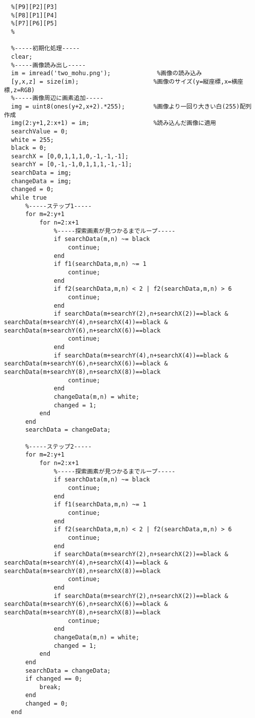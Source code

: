 \documentclass[a4j]{jarticle}
\begin{document}
\begin{verbatim}
  %[P9][P2][P3]
  %[P8][P1][P4]
  %[P7][P6][P5]
  %

  %-----初期化処理-----
  clear;
  %-----画像読み出し-----
  im = imread('two_mohu.png');             %画像の読み込み
  [y,x,z] = size(im);                     %画像のサイズ(y=縦座標,x=横座標,z=RGB)
  %-----画像周辺に画素追加-----
  img = uint8(ones(y+2,x+2).*255);        %画像より一回り大きい白(255)配列作成
  img(2:y+1,2:x+1) = im;                  %読み込んだ画像に適用
  searchValue = 0;
  white = 255;
  black = 0;
  searchX = [0,0,1,1,1,0,-1,-1,-1];
  searchY = [0,-1,-1,0,1,1,1,-1,-1];
  searchData = img;
  changeData = img;
  changed = 0;
  while true
      %-----ステップ1-----
      for m=2:y+1
          for n=2:x+1
              %-----探索画素が見つかるまでループ-----
              if searchData(m,n) ~= black
                  continue;
              end
              if f1(searchData,m,n) ~= 1
                  continue;
              end
              if f2(searchData,m,n) < 2 | f2(searchData,m,n) > 6
                  continue;
              end
              if searchData(m+searchY(2),n+searchX(2))==black & searchData(m+searchY(4),n+searchX(4))==black & searchData(m+searchY(6),n+searchX(6))==black
                  continue;
              end
              if searchData(m+searchY(4),n+searchX(4))==black & searchData(m+searchY(6),n+searchX(6))==black & searchData(m+searchY(8),n+searchX(8))==black
                  continue;
              end
              changeData(m,n) = white;
              changed = 1;
          end
      end
      searchData = changeData;

      %-----ステップ2-----
      for m=2:y+1
          for n=2:x+1
              %-----探索画素が見つかるまでループ-----
              if searchData(m,n) ~= black
                  continue;
              end
              if f1(searchData,m,n) ~= 1
                  continue;
              end
              if f2(searchData,m,n) < 2 | f2(searchData,m,n) > 6
                  continue;
              end
              if searchData(m+searchY(2),n+searchX(2))==black & searchData(m+searchY(4),n+searchX(4))==black & searchData(m+searchY(8),n+searchX(8))==black
                  continue;
              end
              if searchData(m+searchY(2),n+searchX(2))==black & searchData(m+searchY(6),n+searchX(6))==black & searchData(m+searchY(8),n+searchX(8))==black
                  continue;
              end
              changeData(m,n) = white;
              changed = 1;
          end
      end
      searchData = changeData;
      if changed == 0;
          break;
      end
      changed = 0;
  end


\end{verbatim}
\end{document}

